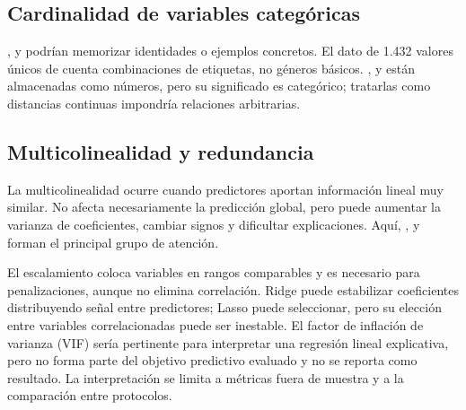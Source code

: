 \subsection{Cardinalidad de variables categóricas}

\begin{table}[H]
\centering
\caption{Cardinalidad sobre el dataset procesado.}
\label{tab:cardinalidad}
\resizebox{\textwidth}{!}{}
\end{table}

,  y  podrían memorizar identidades o ejemplos
concretos. El dato de 1.432 valores únicos de  cuenta combinaciones de etiquetas,
no géneros básicos. ,  y  están almacenadas como números,
pero su significado es categórico; tratarlas como distancias continuas impondría relaciones
arbitrarias.

\subsection{Multicolinealidad y redundancia}

La multicolinealidad ocurre cuando predictores aportan información lineal muy similar. No afecta
necesariamente la predicción global, pero puede aumentar la varianza de coeficientes, cambiar signos
y dificultar explicaciones. Aquí, ,  y  forman el
principal grupo de atención.

El escalamiento coloca variables en rangos comparables y es necesario para penalizaciones, aunque
no elimina correlación. Ridge puede estabilizar coeficientes distribuyendo señal entre predictores;
Lasso puede seleccionar, pero su elección entre variables correlacionadas puede ser inestable. El
factor de inflación de varianza (VIF) sería pertinente para interpretar una regresión lineal
explicativa, pero no forma parte del objetivo predictivo evaluado y no se reporta como resultado.
La interpretación se limita a métricas fuera de muestra y a la comparación entre protocolos.

